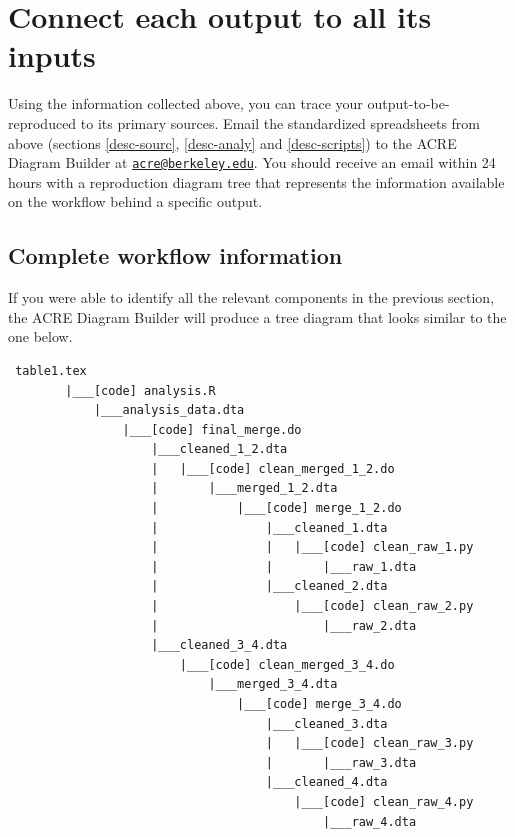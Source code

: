 \documentclass[]{book}
\begin{document}
\hypertarget{diagram}{%
\section{Connect each output to all its inputs}\label{diagram}}

Using the information collected above, you can trace your output-to-be-reproduced to its primary sources. Email the standardized spreadsheets from above (sections \ref{desc-sourc}, \ref{desc-analy} and \ref{desc-scripts}) to the ACRE Diagram Builder at \href{mailto:acre@berkeley.edu}{\nolinkurl{acre@berkeley.edu}}. You should receive an email within 24 hours with a reproduction diagram tree that represents the information available on the workflow behind a specific output.

\hypertarget{complete-workflow-information}{%
\subsection{Complete workflow information}\label{complete-workflow-information}}

If you were able to identify all the relevant components in the previous section, the ACRE Diagram Builder will produce a tree diagram that looks similar to the one below.

\begin{verbatim}
 table1.tex
        |___[code] analysis.R
            |___analysis_data.dta
                |___[code] final_merge.do
                    |___cleaned_1_2.dta
                    |   |___[code] clean_merged_1_2.do
                    |       |___merged_1_2.dta
                    |           |___[code] merge_1_2.do
                    |               |___cleaned_1.dta
                    |               |   |___[code] clean_raw_1.py
                    |               |       |___raw_1.dta
                    |               |___cleaned_2.dta
                    |                   |___[code] clean_raw_2.py
                    |                       |___raw_2.dta
                    |___cleaned_3_4.dta
                        |___[code] clean_merged_3_4.do
                            |___merged_3_4.dta
                                |___[code] merge_3_4.do
                                    |___cleaned_3.dta
                                    |   |___[code] clean_raw_3.py
                                    |       |___raw_3.dta
                                    |___cleaned_4.dta
                                        |___[code] clean_raw_4.py
                                            |___raw_4.dta
\end{verbatim}
\end{document}
